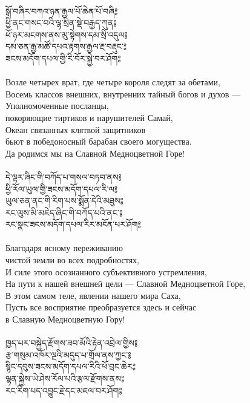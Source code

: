 \\
{\ti སྒོ་བཞིར་བཀའ་ཉན་རྒྱལ་པོ་ཆེན་པོ་བཞི༔\\
ཕྱི་ནང་གསང་བའི་ལྷ་སྲིན་སྡེ་བརྒྱད་ཀུན༔\\
ཕོ་ཉར་མངགས་ནས་མུ་སྟེགས་དམ་སྲི་འདུལ༔\\
དམ་ཅན་རྒྱ་མཚོ་དཔའ་རྟགས་རྒྱལ་རྔ་བརྡུང་༔\\
ཟངས་མདོག་དཔལ་གྱི་རི་བོར་སྐྱེ་བར་ཤོག༔}\\
\\
\ru
Возле четырех врат, где четыре короля следят за обетами,\\
Восемь классов внешних, внутренних тайный богов и духов —\\
Уполномоченные посланцы, \\ \indent покоряющие тиртиков и нарушителей Самай,\\
Океан связанных клятвой защитников \\ \indent бьют в победоносный барабан своего могущества.\\
Да родимся мы на Славной Медноцветной Горе!\\
\\
\newpage
{\ti དེ་ལྟར་ཞིང་གི་བཀོད་པ་གསལ་བཏབ་ནས༔\\
ཕྱི་རོལ་ཡུལ་གྱི་ཟངས་མདོག་དཔལ་རི་ལ༔\\
ཡུལ་ཅན་ནང་གི་རིག་པས་སྨོན་དེའི་མཐུས༔\\
རང་ལུས་མི་མཇེད་ཞིང་གི་བཀོད་པའི་ནང་༔\\
རང་སྣང་ཟངས་མདོག་དཔལ་རིར་མངོན་པར་ཤོག༔}\\
\\
\ru
Благодаря ясному переживанию \\ \indent чистой земли во всех подробностях,\\
И силе этого осознанного субъективного устремления,\\
На пути к нашей внешней цели — Славной Медноцветной Горе,\\
В этом самом теле, явлении нашего мира Саха,\\
Пусть все восприятие преобразуется здесь и сейчас \\ \indent в Славную Медноцветную Гору!\\
\\
{\ti ཁྱད་པར་བསྐྱེད་རྫོགས་ཟབ་མོའི་རྟེན་འབྲེལ་གྱིས༔\\
རྩ་གསུམ་འཁོར་ལྔའི་མདུད་པ་གྲོལ་ནས་ཀྱང་༔\\
སྙིང་དབུས་ཟངས་མདོག་དཔལ་རིའི་ཕོ་བྲང་ཆེར༔\\
ལྷན་སྐྱེས་ཡེ་ཤེས་རོལ་པའི་རྩལ་རྫོགས་ནས༔\\
རང་རིག་པད་འབྱུང་རྗེ་དང་མཇལ་བར་ཤོག༔}\\
